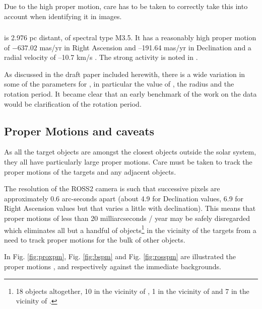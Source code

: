 Due to the high proper motion, care has to be taken to correctly take this into account when identifying it in images.

\subsubsection{\ross}
\protect\label{section:introross}
{\ross} is 2.976 pc distant, of spectral type M3.5. It has a reasonably high
proper motion of $-637.02$ mas/yr in Right Ascension and  {–}191.64 mas/yr
in Declination and a radial velocity of {–}10.7 km/s \citep{vanleeuwen07}.
The strong activity is noted in \citet{wargelin08}.

As discussed in the draft paper included herewith, there is a wide variation in
some of the parameters for {\ross}, in particular the value of \vsini, the
radius and the rotation period. It became clear that an early benchmark of the work on the
{\rem} data would be clarification of the rotation period.

\subsection{Proper Motions and caveats}
\protect\label{section:propermotions}
As all the target objects are amongst the closest objects outside the solar
system, they all have particularly large proper motions. Care must be taken to
track the proper motions of the targets and any adjacent objects.

The resolution of the ROSS2 camera is such that successive pixels
are approximately 0.6 arc-seconds apart (about 4.9 for Declination values, 6.9
for Right Ascension values but that varies a little with declination). This
means that proper motions of less than 20 milliarcseconds / year may be safely
disregarded which eliminates all but a handful of objects\footnote{18 objects
altogether, 10 in the vicinity of \prox, 1 in the vicinity of {\bstar} and 7 in
the vicinity of \ross.} in the vicinity of the targets from a need to track proper
motions for the bulk of other objects.

In Fig. \ref{fig:proxpm}, Fig. \ref{fig:bspm} and Fig. \ref{fig:rosspm} are
illustrated the proper motions \prox, {\bstar} and {\ross} respectively against
the immediate backgrounds.

